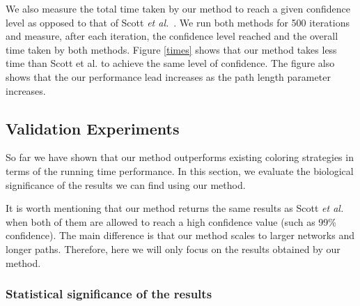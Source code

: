 \documentclass{ws-procs11x85}
\begin{document}
We also measure the total time taken by our method to reach a given
confidence level as opposed to that of Scott {\it et
  al.}~\cite{scott}. We run both methods for 500 iterations and
measure, after each iteration, the confidence level reached and the
overall time taken by both methods. Figure \ref{times} shows that our
method takes less time than Scott et al. to achieve the same level of
confidence. The figure also shows that the our performance lead
increases as the path length parameter increases.



\subsection{Validation Experiments}
\label{sec:validation}


So far we have shown that our method outperforms existing coloring
strategies in terms of the running time performance. In this section,
we evaluate the biological significance of the results we can find
using our method. 

It is worth mentioning that our method returns the same results as
Scott {\it et al.}~\cite{scott} when both of them are allowed to reach
a high confidence value (such as 99\% confidence). The main difference
is that our method scales to larger networks and longer paths.
Therefore, here we will only focus on the results obtained by our
method.


\subsubsection{Statistical significance of the results}
\label{sec:zscore}
\end{document}
